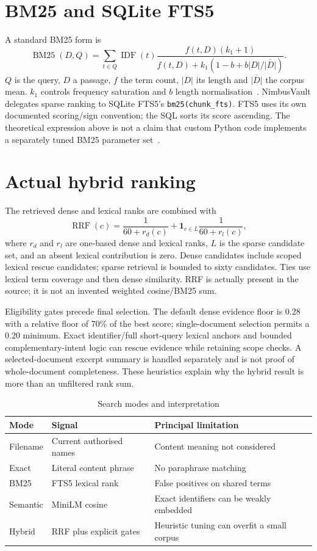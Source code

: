 \section{BM25 and SQLite FTS5}
A standard BM25 form is
\begin{equation}\operatorname{BM25}(D,Q)=\sum_{t\in Q}\operatorname{IDF}(t)\frac{f(t,D)(k_1+1)}{f(t,D)+k_1(1-b+b|D|/\overline{|D|})}.\end{equation}
$Q$ is the query, $D$ a passage, $f$ the term count, $|D|$ its length and $\overline{|D|}$ the corpus mean. $k_1$ controls frequency saturation and $b$ length normalisation~\cite{bm25}. NimbusVault delegates sparse ranking to SQLite FTS5's \texttt{bm25(chunk\_fts)}. FTS5 uses its own documented scoring/sign convention; the SQL sorts its score ascending. The theoretical expression above is not a claim that custom Python code implements a separately tuned BM25 parameter set~\cite{sqlitefts}.
\section{Actual hybrid ranking}
The retrieved dense and lexical ranks are combined with
\begin{equation}\operatorname{RRF}(c)=\frac{1}{60+r_d(c)}+\mathbf{1}_{c\in L}\frac{1}{60+r_l(c)},\end{equation}
where $r_d$ and $r_l$ are one-based dense and lexical ranks, $L$ is the sparse candidate set, and an absent lexical contribution is zero. Dense candidates include scoped lexical rescue candidates; sparse retrieval is bounded to sixty candidates. Ties use lexical term coverage and then dense similarity. RRF is actually present in the source; it is not an invented weighted cosine/BM25 sum.

Eligibility gates precede final selection. The default dense evidence floor is 0.28 with a relative floor of 70\% of the best score; single-document selection permits a 0.20 minimum. Exact identifier/full short-query lexical anchors and bounded complementary-intent logic can rescue evidence while retaining scope checks. A selected-document excerpt summary is handled separately and is not proof of whole-document completeness. These heuristics explain why the hybrid result is more than an unfiltered rank sum.
\par\begin{table}[htbp]\caption{Search modes and interpretation}\small\begin{tabularx}{\linewidth}{lYY}\toprule Mode&Signal&Principal limitation\\\midrule Filename&Current authorised names&Content meaning not considered\\Exact&Literal content phrase&No paraphrase matching\\BM25&FTS5 lexical rank&False positives on shared terms\\Semantic&MiniLM cosine&Exact identifiers can be weakly embedded\\Hybrid&RRF plus explicit gates&Heuristic tuning can overfit a small corpus\\\bottomrule\end{tabularx}\end{table}\par
\FloatBarrier

